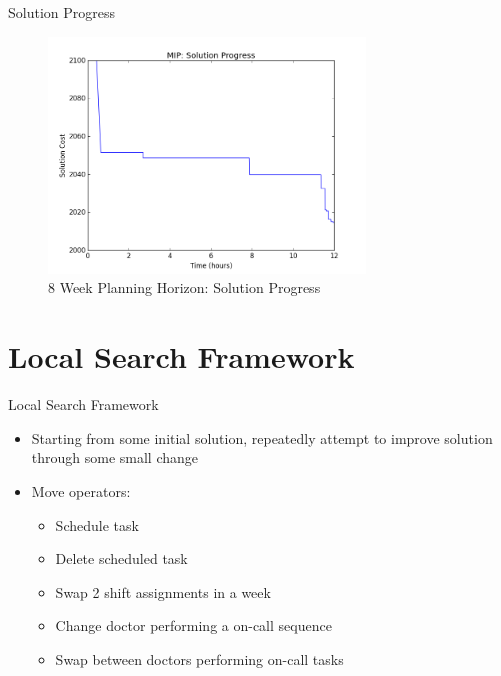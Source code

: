 \documentclass{beamer}
\begin{document}
\begin{frame}{Solution Progress}
    \begin{figure}
        \centering
        \includegraphics[width=0.75\textwidth]{img/Base2MIPclose}
        \caption{8 Week Planning Horizon: Solution Progress}
    \end{figure}
\end{frame}

\section{Local Search Framework}

\begin{frame}{Local Search Framework}
    \begin{itemize}
        \item Starting from some initial solution, repeatedly attempt to improve solution through some small change
        \item Move operators:
            \begin{itemize}
                \item Schedule task
                \item Delete scheduled task
                \item Swap 2 shift assignments in a week
                \item Change doctor performing a on-call sequence
                \item Swap between doctors performing on-call tasks
            \end{itemize}
    \end{itemize}
\end{frame}
\end{document}
